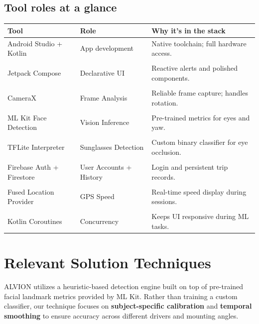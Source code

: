 \documentclass[11pt]{report}
\begin{document}
\subsection*{Tool roles at a glance}
\begin{center}
    \begin{tabular}{p{4.0cm} p{5.0cm} p{6.4cm}}
        \toprule
        \textbf{Tool} & \textbf{Role} & \textbf{Why it’s in the stack} \\
        \midrule
        Android Studio + Kotlin & App development & Native toolchain; full hardware access.\\
        \\
        Jetpack Compose & Declarative UI & Reactive alerts and polished components.\\
        \\
        CameraX & Frame Analysis & Reliable frame capture; handles rotation.\\
        \\
        ML Kit Face Detection & Vision Inference & Pre-trained metrics for eyes and yaw.\\
        \\
        TFLite Interpreter & Sunglasses Detection & Custom binary classifier for eye occlusion.\\
        \\
        Firebase Auth + Firestore & User Accounts + History & Login and persistent trip records.\\
        \\
        Fused Location Provider & GPS Speed & Real-time speed display during sessions.\\
        \\
        Kotlin Coroutines & Concurrency & Keeps UI responsive during ML tasks.\\
        \bottomrule
    \end{tabular}
\end{center}

\section{Relevant Solution Techniques}\label{sec:solutions}
ALVION utilizes a heuristic-based detection engine built on top of pre-trained facial landmark metrics provided by ML Kit. Rather than training a custom classifier, our technique focuses on \textbf{subject-specific calibration} and \textbf{temporal smoothing} to ensure accuracy across different drivers and mounting angles.
\end{document}
